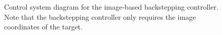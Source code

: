 \begin{figure}[htbp]
	\centering
	\caption{Control system diagram for the image-based backstepping controller. Note that the backstepping controller only requires the image coordinates of the target.}
	\label{system_image}
\end{figure}


